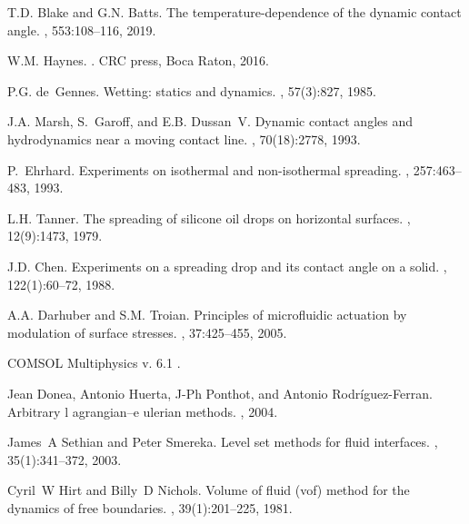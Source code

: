 \documentclass[%
 amsmath,amssymb,
 aps,
10.5pt]{revtex4-2}
\begin{document}
\begin{thebibliography}{10}
T.D. Blake and G.N. Batts.
\newblock The temperature-dependence of the dynamic contact angle.
, 553:108--116, 2019.

W.M. Haynes.
.
\newblock CRC press, Boca Raton, 2016.

P.G. de~Gennes.
\newblock Wetting: statics and dynamics.
, 57(3):827, 1985.

J.A. Marsh, S.~Garoff, and E.B. Dussan~V.
\newblock Dynamic contact angles and hydrodynamics near a moving contact line.
, 70(18):2778, 1993.

P.~Ehrhard.
\newblock Experiments on isothermal and non-isothermal spreading.
, 257:463--483, 1993.

L.H. Tanner.
\newblock The spreading of silicone oil drops on horizontal surfaces.
, 12(9):1473, 1979.

J.D. Chen.
\newblock Experiments on a spreading drop and its contact angle on a solid.
, 122(1):60--72, 1988.

A.A. Darhuber and S.M. Troian.
\newblock Principles of microfluidic actuation by modulation of surface
  stresses.
, 37:425--455, 2005.

{COMSOL Multiphysics\textsuperscript{\tiny\textregistered} v. 6.1 }.

Jean Donea, Antonio Huerta, J-Ph Ponthot, and Antonio Rodr{\'i}guez-Ferran.
\newblock Arbitrary l agrangian--e ulerian methods.
, 2004.

James~A Sethian and Peter Smereka.
\newblock Level set methods for fluid interfaces.
, 35(1):341--372, 2003.

Cyril~W Hirt and Billy~D Nichols.
\newblock Volume of fluid (vof) method for the dynamics of free boundaries.
, 39(1):201--225, 1981.


\end{thebibliography}
\end{document}
